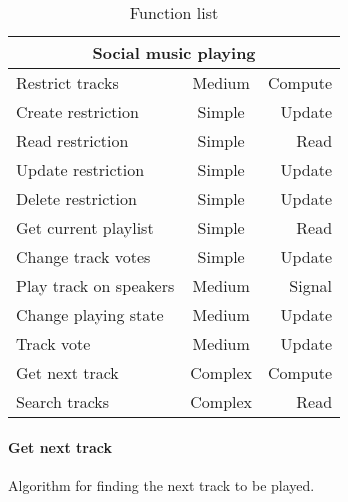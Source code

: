 \begin{table}[hbtp]
\centering
\begin{tabular}{lcr}
\toprule
\multicolumn{3}{c}{\textbf{Social music playing}} \\
\midrule
Restrict tracks                & Medium  & Compute \\
Create restriction             & Simple  & Update  \\
Read restriction               & Simple  & Read    \\
Update restriction             & Simple  & Update  \\
Delete restriction             & Simple  & Update  \\
Get current playlist           & Simple  & Read    \\
Change track votes             & Simple  & Update  \\
Play track on speakers         & Medium  & Signal  \\
Change playing state           & Medium  & Update  \\
Track vote                     & Medium  & Update  \\
Get next track                 & Complex & Compute \\
Search tracks                  & Complex & Read    \\
\bottomrule
\end{tabular}
\caption{Function list}
\label{table:functionlist}
\end{table}

\paragraph{Get next track}

\begin{algorithm}[hbtp]
\caption{Algorithm for finding the next track to be played.}\label{alg:GetNextTrack}
\begin{algorithmic}[1]
		\EndIf{}
			\Else{} 
					\EndIf{}
				\EndIf{}
			\EndIf{}
		\EndFor{}
	\EndFunction{}
\end{algorithmic}
\end{algorithm}

